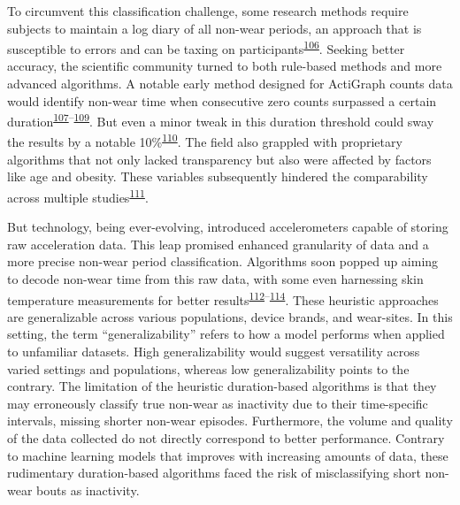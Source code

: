 \documentclass[
  10pt,
]{scrbook}
\begin{document}
To circumvent this classification challenge, some research methods
require subjects to maintain a log diary of all non-wear periods, an
approach that is susceptible to errors and can be taxing on
participants\textsuperscript{\protect\hyperlink{ref-ainsworth_recommendations_2012}{106}}.
Seeking better accuracy, the scientific community turned to both
rule-based methods and more advanced algorithms. A notable early method
designed for ActiGraph counts data would identify non-wear time when
consecutive zero counts surpassed a certain
duration\textsuperscript{\protect\hyperlink{ref-hecht_methodology_2009}{107}--\protect\hyperlink{ref-troiano_how_2020}{109}}.
But even a minor tweak in this duration threshold could sway the results
by a notable
10\%\textsuperscript{\protect\hyperlink{ref-aadland_comparison_2018}{110}}.
The field also grappled with proprietary algorithms that not only lacked
transparency but also were affected by factors like age and obesity.
These variables subsequently hindered the comparability across multiple
studies\textsuperscript{\protect\hyperlink{ref-toftager_accelerometer_2013}{111}}.

But technology, being ever-evolving, introduced accelerometers capable
of storing raw acceleration data. This leap promised enhanced
granularity of data and a more precise non-wear period classification.
Algorithms soon popped up aiming to decode non-wear time from this raw
data, with some even harnessing skin temperature measurements for better
results\textsuperscript{\protect\hyperlink{ref-duncan_wear-time_2018}{112}--\protect\hyperlink{ref-zhou_classification_2015}{114}}.
These heuristic approaches are generalizable across various populations,
device brands, and wear-sites. In this setting, the term
``generalizability'' refers to how a model performs when applied to
unfamiliar datasets. High generalizability would suggest versatility
across varied settings and populations, whereas low generalizability
points to the contrary. The limitation of the heuristic duration-based
algorithms is that they may erroneously classify true non-wear as
inactivity due to their time-specific intervals, missing shorter
non-wear episodes. Furthermore, the volume and quality of the data
collected do not directly correspond to better performance. Contrary to
machine learning models that improves with increasing amounts of data,
these rudimentary duration-based algorithms faced the risk of
misclassifying short non-wear bouts as inactivity.
\end{document}
